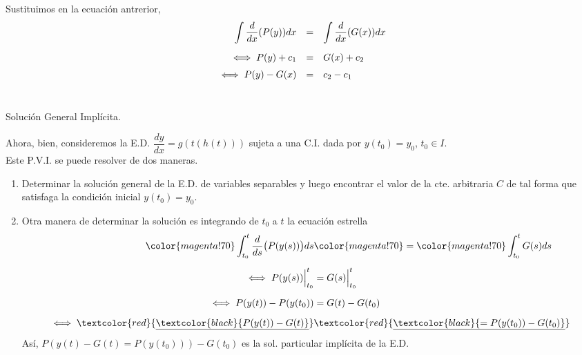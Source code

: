 \documentclass{beamer}
\begin{document}
\begin{frame}[t]
	Sustituimos en la ecuación antrerior,
	\[
		\begin{array}{rcl}
			\displaystyle\int \dfrac{d}{dx} (P(y)) dx &=& \displaystyle\int \dfrac{d}{dx} (G(x)) dx \\[5mm]
			\iff P(y) +c_1 & = & G(x) +c_2 \\[2mm]
			\iff P(y) -G(x) & = & c_2-c_1 \\[2mm]
		\end{array}
	\]
	\begin{center}
		\hspace{-9mm}\textcolor{magenta!70}{} \hspace{5mm}\\[2mm]
		\textcolor{magenta!70}{Solución General Implícita}.
	\end{center} 
	Ahora, bien, consideremos la E.D. \(\dfrac{dy}{dx} =g(t (h(t)))\) sujeta a una C.I. dada por \(y(t_0) =y_0\), \(t_0 \in I\).\\[2mm]
	Este P.V.I. se puede resolver de dos maneras.
\end{frame}

\begin{frame}[t]
	\begin{enumerate}
		\item Determinar la solución general de la E.D. de variables separables y luego encontrar el valor de la cte. arbitraria \(C\) de tal forma que satisfaga la condición inicial \(y(t_0) =y_0\).
		\item Otra manera de determinar la solución es integrando de \(t_0\) a \(t\) la ecuación estrella
			\begin{align*}
				\color{magenta!70} \dis\int _{t_0} ^t \dfrac{d}{ds} \big(P(y(s))\big) ds & \color{magenta!70} = \color{magenta!70} \dis\int _{t_0} ^tG(s) ds \\[2mm]
				\iff P(y(s)) \Big| _{t_0} ^t & = G(s) \Big| _{t_0} ^t \\[2mm]
				\iff P(y(t)) - P(y(t_0)) & = G(t) -G(t_0) \\[2mm]
				\iff \textcolor{red}{\underline{\mathstrut \textcolor{black}{P(y(t)) -G(t)}}} & \textcolor{red}{\underline{\mathstrut \textcolor{black}{= P(y(t_0)) -G(t_0)}}} 
			\end{align*}
			Así, \(P(y(t) -G(t) =P(y(t_0))) -G(t_0)\) es la sol. particular implícita de la E.D.
	\end{enumerate}
\end{frame}
\end{document}
